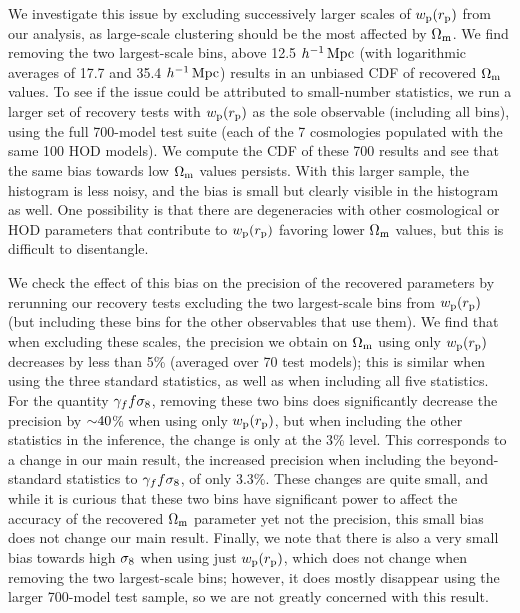 We investigate this issue by excluding successively larger scales of $w_\mathrm{p}(r_\mathrm{p})$ from our analysis, as large-scale clustering should be the most affected by $\Omega_\mathrm{m}$.
We find removing the two largest-scale bins, above 12.5 $h^{-1}\,\mathrm{Mpc}$ (with logarithmic averages of 17.7 and 35.4 $h^{-1}\,\mathrm{Mpc}$) results in an unbiased CDF of recovered $\Omega_\mathrm{m}$ values.
To see if the issue could be attributed to small-number statistics, we run a larger set of recovery tests with $w_\mathrm{p}(r_\mathrm{p})$ as the sole observable (including all bins), using the full 700-model test suite (each of the 7 cosmologies populated with the same 100 HOD models).
We compute the CDF of these 700 results and see that the same bias towards low $\Omega_\mathrm{m}$ values persists.
With this larger sample, the histogram is less noisy, and the bias is small but clearly visible in the histogram as well.
One possibility is that there are degeneracies with other cosmological or HOD parameters that contribute to $w_\mathrm{p}(r_\mathrm{p})$ favoring lower $\Omega_\mathrm{m}$ values, but this is difficult to disentangle.

We check the effect of this bias on the precision of the recovered parameters by rerunning our recovery tests excluding the two largest-scale bins from $w_\mathrm{p}(r_\mathrm{p})$ (but including these bins for the other observables that use them).
We find that when excluding these scales, the precision we obtain on $\Omega_\mathrm{m}$ using only $w_\mathrm{p}(r_\mathrm{p})$ decreases by less than 5\% (averaged over 70 test models); this is similar when using the three standard statistics, as well as when including all five statistics.
For the quantity $\gamma_f f\sigma_8$, removing these two bins does significantly decrease the precision by $\mathord{\sim}40$\% when using only $w_\mathrm{p}(r_\mathrm{p})$, but when including the other statistics in the inference, the change is only at the 3\% level.
This corresponds to a change in our main result, the increased precision when including the beyond-standard statistics to $\gamma_f f\sigma_8$, of only 3.3\%.
These changes are quite small, and while it is curious that these two bins have significant power to affect the accuracy of the recovered $\Omega_\mathrm{m}$ parameter yet not the precision, this small bias does not change our main result. 
Finally, we note that there is also a very small bias towards high $\sigma_\mathrm{8}$ when using just $w_\mathrm{p}(r_\mathrm{p})$, which does not change when removing the two largest-scale bins; however, it does mostly disappear using the larger 700-model test sample, so we are not greatly concerned with this result.

